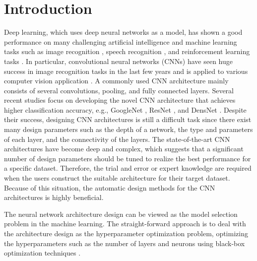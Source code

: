 \section{Introduction}

Deep learning, which uses deep neural networks as a model, has shown a good performance on many challenging artificial intelligence and machine learning tasks such as image recognition \cite{lecun_gradient-based_1998,krizhevsky_imagenet_2012}, speech recognition \cite{hinton_deep_2012}, and reinforcement learning tasks \cite{mnih_playing_2013,mnih_human-level_2015}.
In particular, convolutional neural networks (CNNs) \cite{lecun_gradient-based_1998} have seen huge success in image recognition tasks in the last few years and is applied to various computer vision application \cite{vinyals_show_2015,zhang_colorful_2016}.  
A commonly used CNN architecture mainly consists of several convolutions, pooling, and fully connected layers.
Several recent studies focus on developing the novel CNN architecture that achieves higher classification accuracy, e.g., GoogleNet \cite{szegedy_going_2015}, ResNet \cite{he_deep_2016}, and DensNet \cite{huang_densely_2016}.
Despite their success, designing CNN architectures is still a difficult task since there exist many design parameters such as the depth of a network, the type and parameters of each layer, and the connectivity of the layers.
The state-of-the-art CNN architectures have become deep and complex, which suggests that a significant number of design parameters should be tuned to realize the best performance for a specific dataset.
Therefore, the trial and error or expert knowledge are required when the users construct the suitable architecture for their target dataset.
Because of this situation, the automatic design methods for the CNN architectures is highly beneficial.

The neural network architecture design can be viewed as the model selection problem in the machine learning. The straight-forward approach is to deal with the architecture design as the hyperparameter optimization problem, optimizing the hyperparameters such as the number of layers and neurons using black-box optimization techniques .

